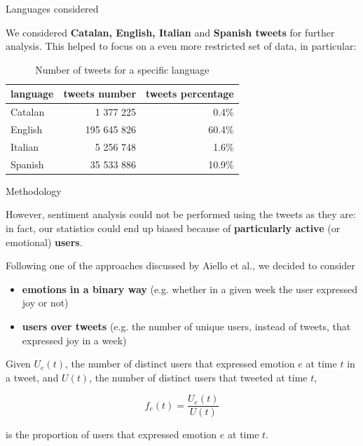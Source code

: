 \documentclass[8pt]{beamer}  %
\begin{document}
\begin{frame}{Languages considered}
    
	We considered \textbf{Catalan, English, Italian} and \textbf{Spanish tweets} for further analysis. This helped to focus on a even more restricted set of data, in particular:
	
	\begin{table}[h]
        \centering
        \begin{tabularx}{\textwidth}{Xrr}
            language & tweets number & tweets percentage \\
            \midrule
                Catalan & 1 377 225 & 0.4\%
                \\ \lightrule
                English & 195 645 826 & 60.4\%
                \\ \lightrule
                Italian & 5 256 748 & 1.6\%
                \\ \lightrule
                Spanish & 35 533 886 & 10.9\%
        \end{tabularx}
        \caption{Number of tweets for a specific language}
        \label{tab:lang_dim}
    \end{table}
	
\end{frame}

\begin{frame}{Methodology}

    However, sentiment analysis could not be performed using the tweets as they are: in fact, our statistics could end up biased because of \textbf{particularly active} (or emotional) \textbf{users}.
	
	Following one of the approaches discussed by Aiello et al.\autocite{aiello2020epidemic}, we decided to consider
	
	\begin{itemize}
	    \item \textbf{emotions in a binary way} (e.g. whether in a given week the user expressed joy or not)
	    \item \textbf{users over tweets} (e.g. the number of unique users, instead of tweets, that expressed joy in a week)
	\end{itemize}
	
	\begin{definition}
	    Given \(U_e(t)\), the number of distinct users that expressed emotion \(e\) at time \(t\) in a tweet, and \(U(t)\), the number of distinct users that tweeted at time \(t\),
	    
	    \[f_e(t) = \frac{U_e(t)}{U(t)}\]
	    
	    is the proportion of users that expressed emotion \(e\) at time \(t\).
	\end{definition}

\end{frame}
\end{document}
